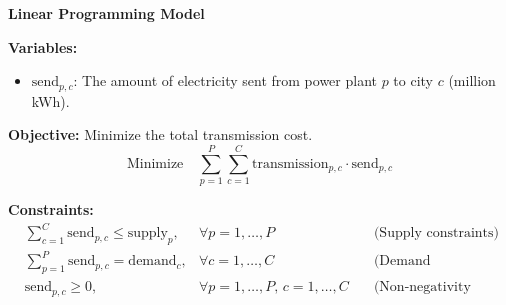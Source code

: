 \documentclass{article}
\begin{document}
\textbf{Linear Programming Model}

\textbf{Variables:}
\begin{itemize}
    \item $\text{send}_{p,c}$: The amount of electricity sent from power plant $p$ to city $c$ (million kWh).
\end{itemize}

\textbf{Objective:} Minimize the total transmission cost.
\[
\text{Minimize} \quad \sum_{p=1}^{P} \sum_{c=1}^{C} \text{transmission}_{p,c} \cdot \text{send}_{p,c}
\]

\textbf{Constraints:}
\begin{align*}
    & \sum_{c=1}^{C} \text{send}_{p,c} \leq \text{supply}_{p}, & \forall p = 1, \ldots, P \quad &\text{(Supply constraints)} \\
    & \sum_{p=1}^{P} \text{send}_{p,c} = \text{demand}_{c}, & \forall c = 1, \ldots, C \quad &\text{(Demand constraints)} \\
    & \text{send}_{p,c} \geq 0, & \forall p = 1, \ldots, P, \, c = 1, \ldots, C \quad &\text{(Non-negativity constraints)}
\end{align*}
\end{document}
